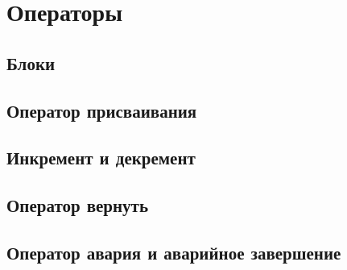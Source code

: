 \hypertarget{statements}{%
\section{Операторы}\label{stmt:chapter}}

\hypertarget{blocks}{%
\subsection{Блоки}\label{stmt:blocks}}

\hypertarget{assignment}{%
\subsection{Оператор присваивания}\label{stmt:assignment}}

\hypertarget{inc-dec}{%
\subsection{Инкремент и декремент}\label{stmt:inc-dec}}

\hypertarget{return}{%
\subsection{Оператор вернуть}\label{stmt:return}}

\hypertarget{crash}{%
\subsection{Оператор авария и аварийное завершение}\label{stmt:crash}}